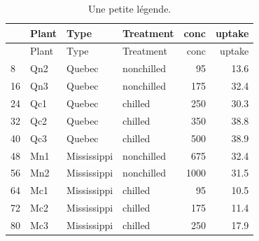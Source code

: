 \begin{longtable}[]{@{}llllrr@{}}
\caption{Une petite légende. \label{tbl:intr_1}}\tabularnewline
\toprule
\begin{minipage}[b]{0.16\columnwidth}\raggedright\strut
\strut
\end{minipage} & \begin{minipage}[b]{0.16\columnwidth}\raggedright\strut
Plant\strut
\end{minipage} & \begin{minipage}[b]{0.16\columnwidth}\raggedright\strut
Type\strut
\end{minipage} & \begin{minipage}[b]{0.16\columnwidth}\raggedright\strut
Treatment\strut
\end{minipage} & \begin{minipage}[b]{0.16\columnwidth}\raggedleft\strut
conc\strut
\end{minipage} & \begin{minipage}[b]{0.16\columnwidth}\raggedleft\strut
uptake\strut
\end{minipage}\tabularnewline
\midrule
\endfirsthead
\toprule
\begin{minipage}[b]{0.16\columnwidth}\raggedright\strut
\strut
\end{minipage} & \begin{minipage}[b]{0.16\columnwidth}\raggedright\strut
Plant\strut
\end{minipage} & \begin{minipage}[b]{0.16\columnwidth}\raggedright\strut
Type\strut
\end{minipage} & \begin{minipage}[b]{0.16\columnwidth}\raggedright\strut
Treatment\strut
\end{minipage} & \begin{minipage}[b]{0.16\columnwidth}\raggedleft\strut
conc\strut
\end{minipage} & \begin{minipage}[b]{0.16\columnwidth}\raggedleft\strut
uptake\strut
\end{minipage}\tabularnewline
\midrule
\endhead
8 & Qn2 & Quebec & nonchilled & 95 & 13.6\tabularnewline
16 & Qn3 & Quebec & nonchilled & 175 & 32.4\tabularnewline
24 & Qc1 & Quebec & chilled & 250 & 30.3\tabularnewline
32 & Qc2 & Quebec & chilled & 350 & 38.8\tabularnewline
40 & Qc3 & Quebec & chilled & 500 & 38.9\tabularnewline
48 & Mn1 & Mississippi & nonchilled & 675 & 32.4\tabularnewline
56 & Mn2 & Mississippi & nonchilled & 1000 & 31.5\tabularnewline
64 & Mc1 & Mississippi & chilled & 95 & 10.5\tabularnewline
72 & Mc2 & Mississippi & chilled & 175 & 11.4\tabularnewline
80 & Mc3 & Mississippi & chilled & 250 & 17.9\tabularnewline
\bottomrule
\end{longtable}

